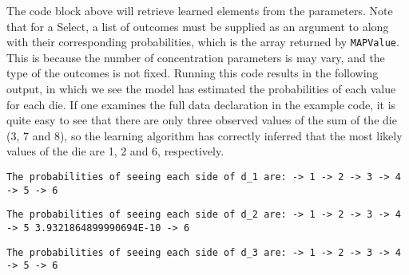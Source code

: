 The code block above will retrieve learned elements from the parameters. Note that for a Select, a list of outcomes must be supplied as an argument to along with their corresponding probabilities, which is the array returned by \texttt{MAPValue}. This is because the number of concentration parameters is may vary, and the type of the outcomes is not fixed. Running this code results in the following output, in which we see the model has estimated the probabilities of each value for each die. If one examines the full data declaration in the example code, it is quite easy to see that there are only three observed values of the sum of the die (3, 7 and 8), so the learning algorithm has correctly inferred that the most likely values of the die are 1, 2 and 6, respectively.

\begin{flushleft}
\texttt{The probabilities of seeing each side of d\_1 are:
\newline {} -> 1
\newline {} -> 2
\newline {} -> 3
\newline {} -> 4
\newline {} -> 5
\newline {} -> 6
}
\end{flushleft}


\begin{flushleft}
\texttt{The probabilities of seeing each side of d\_2 are:
\newline {} -> 1
\newline {} -> 2
\newline {} -> 3
\newline {} -> 4
\newline {} -> 5
\newline \tab 3.9321864899990694E-10 -> 6
}
\end{flushleft}


\begin{flushleft}
\texttt{The probabilities of seeing each side of d\_3 are:
\newline {} -> 1
\newline {} -> 2
\newline {} -> 3
\newline {} -> 4
\newline {} -> 5
\newline {} -> 6
}
\end{flushleft}













